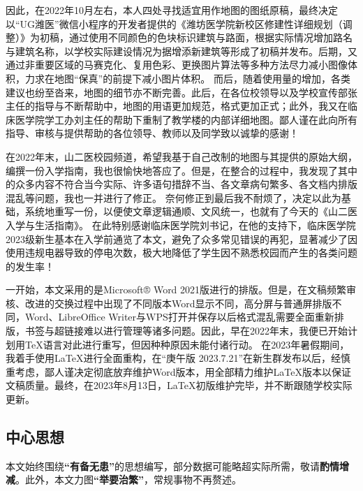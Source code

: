 因此，在2022年10月左右，本人四处寻找适宜用作地图的图纸原稿，最终决定以“UG潍医”微信小程序的开发者提供的《潍坊医学院新校区修建性详细规划（调整）》为初稿，通过使用不同颜色的色块标识建筑与路面，根据实际情况增加路名与建筑名称，以学校实际建设情况为据增添新建筑等形成了初稿并发布\footnotemark。后期，又通过非重要区域的马赛克化、复用色彩、更换图片算法等多种方法尽力减小图像体积，力求在地图“保真”的前提下减小图片体积。%
%
而后，随着使用量的增加，各类建议也纷至沓来，地图的细节亦不断完善。此后，在各位校领导以及学校宣传部张主任的指导与不断帮助中，地图的用语更加规范，格式更加正式；此外，我又在临床医学院学工办刘主任的帮助下重制了教学楼的内部详细地图。鄙人谨在此向所有指导、审核与提供帮助的各位领导、教师以及同学致以诚挚的感谢！

在2022年末，山二医校园频道\footnotemark，希望我基于自己改制的地图与其提供的原始大纲，编撰一份入学指南，我也很愉快地答应了。但是，在整合的过程中，我发现了其中的众多内容不符合当今实际、许多语句措辞不当、各文章病句繁多、各文档内排版混乱等问题，我也一并进行了修正。%
%
奈何修正到最后我不耐烦了，决定以此为基础，系统地重写一份，以便使文章逻辑通顺、文风统一，也就有了今天的《山二医入学与生活指南》\footnotemark。
%
在此特别感谢临床医学院刘书记，在他的支持下，临床医学院2023级新生基本在入学前通览了本文，避免了众多常见错误的再犯，显著减少了因使用违规电器导致的停电次数，极大地降低了学生因不熟悉校园而产生的各类问题的发生率！

一开始，本文采用的是Microsoft® Word 2021版进行的排版。但是，在文稿频繁审核、改进的交换过程中出现了不同版本Word显示不同，高分屏与普通屏排版不同，Word、LibreOffice Writer与WPS打开并保存以后格式混乱需要全面重新排版，书签与超链接难以进行管理等诸多问题。因此，早在2022年末，我便已开始计划用\TeX 语言对此进行重写，但因种种原因未能付诸行动。%
在2023年暑假期间，我着手使用\LaTeX 进行全面重构，在“庚午版 2023.7.21”在新生群发布以后，经慎重考虑，鄙人谨决定彻底放弃维护Word版本\footnotemark，用全部精力维护\LaTeX 版本以保证文稿质量。最终，在2023年8月13日，\LaTeX 初版维护完毕，并不断跟随学校实际更新。

\subsection[中心思想]{中心思想}
本文始终围绕\textbf{“有备无患”}的思想编写，部分数据可能略超实际所需，敬请\textbf{酌情增减}。此外，本文力图\textbf{“举要治繁”}，常规事物不再赘述。

